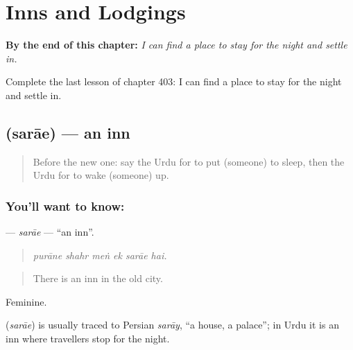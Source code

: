 
\chapter{Inns and Lodgings}
\label{ch:ur-inns-and-lodgings}

\begin{chapteropening}
\textbf{By the end of this chapter:} \emph{I can find a place to stay for the night and settle in.}

Complete the last lesson of chapter 403: I can find a place to stay for the night and settle in.
\end{chapteropening}

\section[\texorpdfstring{\ur{سرائے} (sarāe)}{سرائے (sarāe)}]{ (sarāe) — an inn}

\label{lesson:UR-C403-sarae}



\begin{quote}
Before the new one: say the Urdu for to put (someone) to sleep, then the Urdu for to wake (someone) up.
\end{quote}

\subsection*{You'll want to know: }
\textbf{} — \emph{sarāe} — \textquotedblleft{}an inn\textquotedblright{}.

\begin{quote}
     
\end{quote}

\begin{quote}
\emph{purāne shahr meṅ ek sarāe hai.}
\end{quote}

\begin{quote}
There is an inn in the old city.
\end{quote}

Feminine.

\begin{cousinweb}
\textbf{} (\emph{sarāe}) is usually traced to Persian \emph{sarāy}, \textquotedblleft{}a house, a palace\textquotedblright{}; in Urdu it is an inn where travellers stop for the night.
\end{cousinweb}

